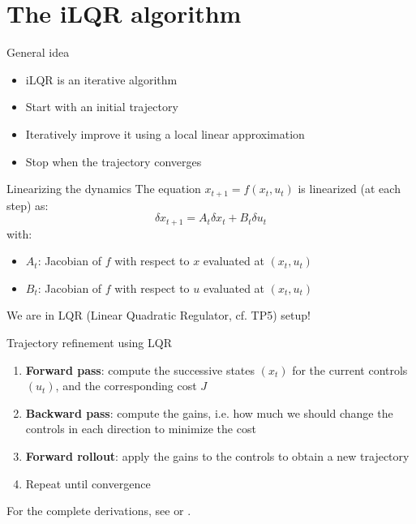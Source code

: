 \documentclass[aspectratio=169,draft]{beamer}
\begin{document}
\section{The iLQR algorithm}
\begin{frame}{General idea}
    \begin{itemize}
        \item iLQR is an iterative algorithm
        \item Start with an initial trajectory
        \item Iteratively improve it using a local linear approximation
        \item Stop when the trajectory converges
    \end{itemize}
\end{frame}

\begin{frame}{Linearizing the dynamics}
    The equation $x_{t+1} = f(x_t, u_t)$ is linearized (at each step) as:
    \begin{equation*}
        \delta x_{t+1} = A_t \delta x_t + B_t \delta u_t
    \end{equation*}
    with:
    \begin{itemize}
        \item $A_t$: Jacobian of $f$ with respect to $x$ evaluated at $(x_t, u_t)$
        \item $B_t$: Jacobian of $f$ with respect to $u$ evaluated at $(x_t, u_t)$
    \end{itemize}
    We are in LQR (Linear Quadratic Regulator, cf. TP5) setup!
\end{frame}

\begin{frame}{Trajectory refinement using LQR}
    \begin{enumerate}
        \item \textbf{Forward pass}: compute the successive states $(x_t)$ for the current controls $(u_t)$, and the corresponding cost $J$
        \item \textbf{Backward pass}: compute the gains, i.e. how much we should change the controls in each direction to minimize the cost
        \item \textbf{Forward rollout}: apply the gains to the controls to obtain a new trajectory
        \item Repeat until convergence
    \end{enumerate}
    \vspace*{1cm}
    For the complete derivations, see \cite{jackson2019ilqr} or \cite{harley2020ilqr}.
\end{frame}
\end{document}
